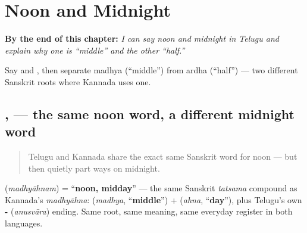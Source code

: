 
\chapter{Noon and Midnight}
\label{ch:te-noon-and-midnight}

\begin{chapteropening}
\textbf{By the end of this chapter:} \emph{I can say noon and midnight in Telugu and explain why one is \textquotedblleft{}middle\textquotedblright{} and the other \textquotedblleft{}half.\textquotedblright{}}

Say  and , then separate madhya (\textquotedblleft{}middle\textquotedblright{}) from ardha (\textquotedblleft{}half\textquotedblright{}) — two different Sanskrit roots where Kannada uses one.
\end{chapteropening}

\section[\texorpdfstring{\te{మధ్యాహ్నం} \te{అర్ధరాత్రి} (madhyāhnam ardharātri)}{మధ్యాహ్నం అర్ధరాత్రి (madhyāhnam ardharātri)}]{,  — the same noon word, a different midnight word}

\label{lesson:TE-C17-madhyaahnam-ardharaatri}



\begin{quote}
Telugu and Kannada share the exact same Sanskrit word for noon — but then quietly part ways on midnight.
\end{quote}

\begin{cousinweb}
\textbf{} (\emph{madhyāhnam}) = \textquotedblleft{}\textbf{noon, midday}\textquotedblright{} — the same Sanskrit \emph{tatsama} compound as Kannada's \emph{madhyāhna}: \textbf{} (\emph{madhya}, \textquotedblleft{}\textbf{middle}\textquotedblright{}) + \textbf{} (\emph{ahna}, \textquotedblleft{}\textbf{day}\textquotedblright{}), plus Telugu's own \textbf{-} (\emph{anusvāra}) ending. Same root, same meaning, same everyday register in both languages.
\end{cousinweb}

